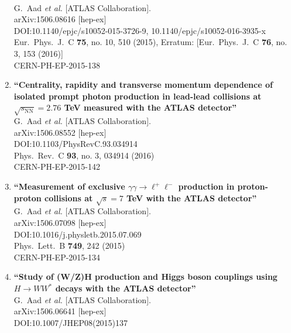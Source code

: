 \documentclass{article}
\begin{document}
\begin{enumerate}
  \\{}G.~Aad {\it et al.} [ATLAS Collaboration].
  \\{}arXiv:1506.08616 [hep-ex]
  \\{}DOI:10.1140/epjc/s10052-015-3726-9, 10.1140/epjc/s10052-016-3935-x
  \\{}Eur.\ Phys.\ J.\ C {\bf 75}, no. 10, 510 (2015), Erratum: [Eur.\ Phys.\ J.\ C {\bf 76}, no. 3, 153 (2016)]
  \\{}CERN-PH-EP-2015-138
\item%
{\bf ``Centrality, rapidity and transverse momentum dependence of isolated prompt photon production in lead-lead collisions at $\sqrt{s_{\mathrm{NN}}} = 2.76$ TeV measured with the ATLAS detector''}
  \\{}G.~Aad {\it et al.} [ATLAS Collaboration].
  \\{}arXiv:1506.08552 [hep-ex]
  \\{}DOI:10.1103/PhysRevC.93.034914
  \\{}Phys.\ Rev.\ C {\bf 93}, no. 3, 034914 (2016)
  \\{}CERN-PH-EP-2015-142
\item%
{\bf ``Measurement of exclusive $\gamma\gamma\rightarrow \ell^+\ell^-$ production in proton-proton collisions at $\sqrt{s} = 7$ TeV with the ATLAS detector''}
  \\{}G.~Aad {\it et al.} [ATLAS Collaboration].
  \\{}arXiv:1506.07098 [hep-ex]
  \\{}DOI:10.1016/j.physletb.2015.07.069
  \\{}Phys.\ Lett.\ B {\bf 749}, 242 (2015)
  \\{}CERN-PH-EP-2015-134
\item%
{\bf ``Study of (W/Z)H production and Higgs boson couplings using $H \rightarrow WW^{\ast}$ decays with the ATLAS detector''}
  \\{}G.~Aad {\it et al.} [ATLAS Collaboration].
  \\{}arXiv:1506.06641 [hep-ex]
  \\{}DOI:10.1007/JHEP08(2015)137

\end{enumerate}
\end{document}
